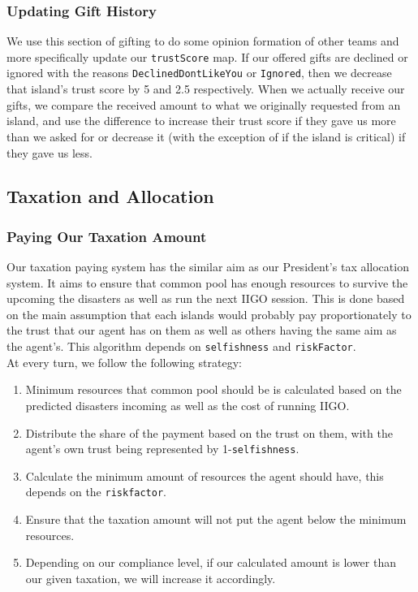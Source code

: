 \subsubsection{Updating Gift History}
We use this section of gifting to do some opinion formation of other teams and more specifically update our \texttt{trustScore} map. If our offered gifts are declined or ignored with the reasons \texttt{DeclinedDontLikeYou} or \texttt{Ignored}, then we decrease that island's trust score by 5 and 2.5 respectively. When we actually receive our gifts, we compare the received amount to what we originally requested from an island, and use the difference to increase their trust score if they gave us more than we asked for or decrease it (with the exception of if the island is critical) if they gave us less.

\subsection{Taxation and Allocation}
\subsubsection*{Paying Our Taxation Amount}
Our taxation paying system has the similar aim as our President's tax allocation system. It aims to ensure that common pool has enough resources to survive the upcoming the disasters as well as run the next IIGO session. This is done based on the main assumption that each islands would probably pay proportionately to the trust that our agent has on them as well as others having the same aim as the agent's. This algorithm depends on \texttt{selfishness} and \texttt{riskFactor}.\\

At every turn, we follow the following strategy:

\begin{enumerate}
    \item Minimum resources that common pool should be is calculated based on the predicted disasters incoming as well as the cost of running IIGO.
    \item Distribute the share of the payment based on the trust on them, with the agent's own trust being represented by 1-\texttt{selfishness}.
    \item Calculate the minimum amount of resources the agent should have, this depends on the \texttt{riskfactor}. 
    \item Ensure that the taxation amount will not put the agent below the minimum resources. 
    \item Depending on our compliance level, if our calculated amount is lower than our given taxation, we will increase it accordingly.
\end{enumerate}


